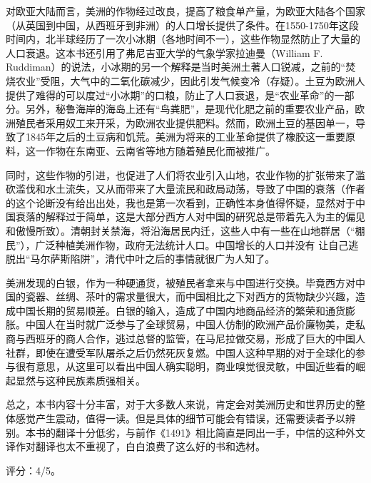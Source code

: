 对欧亚大陆而言，美洲的作物经过改良，提高了粮食单产量，为欧亚大陆各个国家（从英国到中国，从西班牙到非洲）的人口增长提供了条件。在1550-1750年这段时间内，北半球经历了一次小冰期（各地时间不一），这些作物显然防止了大量的人口衰退。这本书还引用了弗尼吉亚大学的气象学家拉迪曼（William F. Ruddiman）的说法，小冰期的另一个解释是当时美洲土著人口锐减，之前的“焚烧农业”受阻，大气中的二氧化碳减少，因此引发气候变冷（存疑）。土豆为欧洲人提供了难得的可以度过“小冰期”的口粮，防止了人口衰退，是“农业革命”的一部分。另外，秘鲁海岸的海岛上还有“鸟粪肥”，是现代化肥之前的重要农业产品，欧洲殖民者采用奴工来开采，为欧洲农业提供肥料。然而，欧洲土豆的基因单一，导致了1845年之后的土豆病和饥荒。美洲为将来的工业革命提供了橡胶这一重要原料，这一作物在东南亚、云南省等地方随着殖民化而被推广。

同时，这些作物的引进，也促进了人们将农业引入山地，农业作物的扩张带来了滥砍滥伐和水土流失，又从而带来了大量流民和政局动荡，导致了中国的衰落（作者的这个论断没有给出出处，我也是第一次看到，正确性本身值得怀疑，显然对于中国衰落的解释过于简单，这是大部分西方人对中国的研究总是带着先入为主的偏见和傲慢所致）。清朝封关禁海，将沿海居民内迁，这些人中有一些在山地群居（“棚民”），广泛种植美洲作物，政府无法统计人口。中国增长的人口并没有 让自己逃脱出“马尔萨斯陷阱”，清代中叶之后的事情就很广为人知了。


美洲发现的白银，作为一种硬通货，被殖民者拿来与中国进行交换。毕竟西方对中国的瓷器、丝绸、茶叶的需求量很大，而中国相比之下对西方的货物缺少兴趣，造成中国长期的贸易顺差。白银的输入，造成了中国内地商品经济的繁荣和通货膨胀。中国人在当时就广泛参与了全球贸易，中国人仿制的欧洲产品价廉物美，走私商与西班牙的商人合作，逃过总督的监管，在马尼拉做交易，形成了巨大的中国人社群，即使在遭受军队屠杀之后仍然死灰复燃。中国人这种早期的对于全球化的参与很有意思，从这里可以看出中国人确实聪明，商业嗅觉很灵敏，中国近些看的崛起显然与这种民族素质强相关。

总之，本书内容十分丰富，对于大多数人来说，肯定会对美洲历史和世界历史的整体感觉产生震动，值得一读。但是具体的细节可能会有错误，还需要读者予以辨别。本书的翻译十分低劣，与前作《1491》相比简直是同出一手，中信的这种外文译作对翻译也太不重视了，白白浪费了这么好的书和选材。

评分：4/5。
